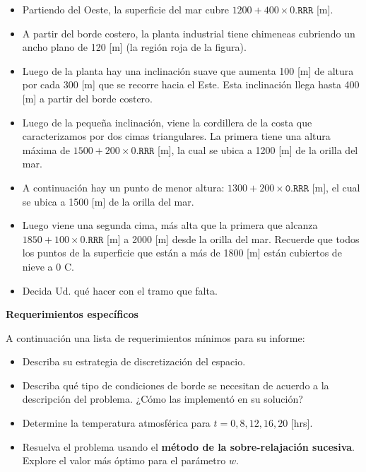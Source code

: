 \documentclass[letterpaper, 11pt]{article}
\newcommand{\newtitle}[1]{\noindent\Large{\textbf{#1}}\\\vspace*{-0.5em}\normalsize}
\begin{document}
\begin{itemize}[label={--}]
	\item Partiendo del Oeste, la superficie del mar cubre $1200 + 400 \times
	0.\texttt{RRR}$ [m].
	\item A partir del borde costero, la planta industrial tiene chimeneas
	cubriendo un ancho plano de 120 [m] (la región roja de la figura).
	\item Luego de la planta hay una inclinación suave que aumenta 100 [m] de
	altura por cada 300 [m] que se recorre hacia el Este. Esta inclinación llega
	hasta 400 [m] a partir del borde costero.
	\item Luego de la pequeña inclinación, viene la cordillera de la costa
	que caracterizamos por dos cimas triangulares. La primera tiene una altura
	máxima de $1500 + 200 \times 0.\texttt{RRR}$ [m], la cual se ubica a 1200 [m]
	de la orilla del mar.
	\item A continuación hay un punto de menor altura: $1300 + 200
	\times\texttt{0.RRR}$ [m], el cual se ubica a 1500 [m] de la orilla del mar.
	\item Luego viene una segunda cima, más alta que la primera que alcanza
	$1850 + 100 \times 0.\texttt{RRR}$ [m] a 2000 [m] desde la orilla del mar.
	Recuerde que todos los puntos de la superficie que están a más de 1800 [m]
	están cubiertos de nieve a 0 \textordmasculine C.
	\item Decida Ud. qué hacer con el tramo que falta.
\end{itemize}

\vspace{0.5em}
\newtitle{Requerimientos específicos}

\par \indent A continuación una lista de requerimientos mínimos para su informe:
\begin{itemize}[label={--}]
	\item Describa su estrategia de discretización del espacio.
	\item Describa qué tipo de condiciones de borde se necesitan de acuerdo a
	la descripción del problema. ¿Cómo las implementó en su solución?
	\item Determine la temperatura atmosférica para $t = 0, 8, 12, 16, 20$
	[hrs].
	\item Resuelva el problema usando el \textbf{método de la sobre-relajación
		sucesiva}. Explore el valor más óptimo para el parámetro $w$.
\end{itemize}
\end{document}
